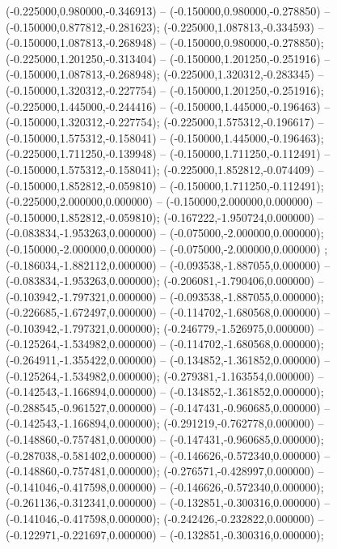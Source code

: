  (-0.225000,0.980000,-0.346913) -- (-0.150000,0.980000,-0.278850) -- (-0.150000,0.877812,-0.281623);
 (-0.225000,1.087813,-0.334593) -- (-0.150000,1.087813,-0.268948) -- (-0.150000,0.980000,-0.278850);
 (-0.225000,1.201250,-0.313404) -- (-0.150000,1.201250,-0.251916) -- (-0.150000,1.087813,-0.268948);
 (-0.225000,1.320312,-0.283345) -- (-0.150000,1.320312,-0.227754) -- (-0.150000,1.201250,-0.251916);
 (-0.225000,1.445000,-0.244416) -- (-0.150000,1.445000,-0.196463) -- (-0.150000,1.320312,-0.227754);
 (-0.225000,1.575312,-0.196617) -- (-0.150000,1.575312,-0.158041) -- (-0.150000,1.445000,-0.196463);
 (-0.225000,1.711250,-0.139948) -- (-0.150000,1.711250,-0.112491) -- (-0.150000,1.575312,-0.158041);
 (-0.225000,1.852812,-0.074409) -- (-0.150000,1.852812,-0.059810) -- (-0.150000,1.711250,-0.112491);
 (-0.225000,2.000000,0.000000) -- (-0.150000,2.000000,0.000000) -- (-0.150000,1.852812,-0.059810);
 (-0.167222,-1.950724,0.000000) -- (-0.083834,-1.953263,0.000000) -- (-0.075000,-2.000000,0.000000);
 (-0.150000,-2.000000,0.000000) -- (-0.075000,-2.000000,0.000000) ;
 (-0.186034,-1.882112,0.000000) -- (-0.093538,-1.887055,0.000000) -- (-0.083834,-1.953263,0.000000);
 (-0.206081,-1.790406,0.000000) -- (-0.103942,-1.797321,0.000000) -- (-0.093538,-1.887055,0.000000);
 (-0.226685,-1.672497,0.000000) -- (-0.114702,-1.680568,0.000000) -- (-0.103942,-1.797321,0.000000);
 (-0.246779,-1.526975,0.000000) -- (-0.125264,-1.534982,0.000000) -- (-0.114702,-1.680568,0.000000);
 (-0.264911,-1.355422,0.000000) -- (-0.134852,-1.361852,0.000000) -- (-0.125264,-1.534982,0.000000);
 (-0.279381,-1.163554,0.000000) -- (-0.142543,-1.166894,0.000000) -- (-0.134852,-1.361852,0.000000);
 (-0.288545,-0.961527,0.000000) -- (-0.147431,-0.960685,0.000000) -- (-0.142543,-1.166894,0.000000);
 (-0.291219,-0.762778,0.000000) -- (-0.148860,-0.757481,0.000000) -- (-0.147431,-0.960685,0.000000);
 (-0.287038,-0.581402,0.000000) -- (-0.146626,-0.572340,0.000000) -- (-0.148860,-0.757481,0.000000);
 (-0.276571,-0.428997,0.000000) -- (-0.141046,-0.417598,0.000000) -- (-0.146626,-0.572340,0.000000);
 (-0.261136,-0.312341,0.000000) -- (-0.132851,-0.300316,0.000000) -- (-0.141046,-0.417598,0.000000);
 (-0.242426,-0.232822,0.000000) -- (-0.122971,-0.221697,0.000000) -- (-0.132851,-0.300316,0.000000);
